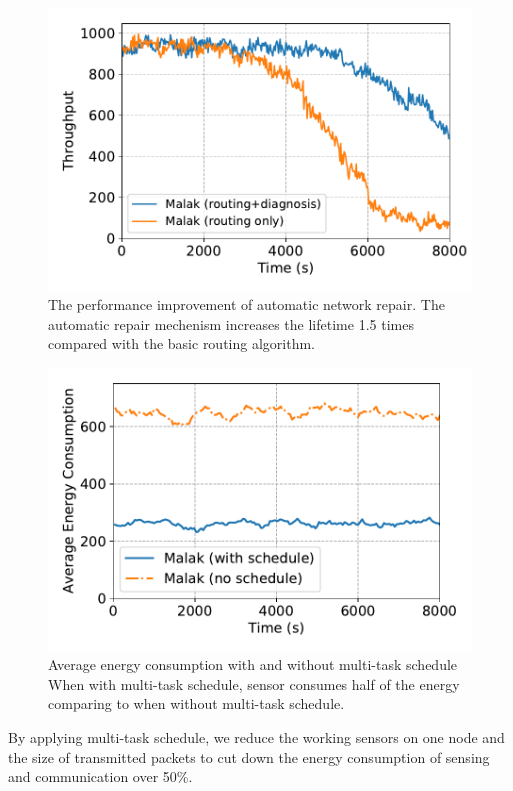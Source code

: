 \begin{figure}[!h]
	\centering
	\includegraphics[width=.95\columnwidth]{Figure/diagnosis}
	\vspace{-0.1in}
	\caption{The performance improvement of automatic network repair.
		\textnormal{
			The automatic repair mechenism increases the lifetime 1.5 times
			compared with the basic {\sdn} routing algorithm.
		}}
	\label{fig:diagnosis}
\end{figure}

\begin{figure}[!h]
	\centering
	\includegraphics[width=.95\columnwidth]{Figure/multitask_energy}
	\vspace{-0.1in}
	\caption{Average energy consumption with and without multi-task schedule
		\textnormal{When with multi-task schedule, sensor consumes half of the energy
			comparing to when without multi-task schedule.}}
	\label{fig:multitask_energy}
\end{figure}

By applying multi-task schedule, we reduce the working sensors on one node and
the size of transmitted packets to cut down the energy consumption of sensing
and communication over 50\%.

